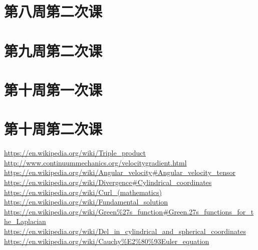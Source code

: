 \documentclass{article}
\numberwithin{equation}{section}
\begin{document}
\section{第八周第二次课}

\section{第九周第二次课}

\section{第十周第一次课}

\section{第十周第二次课}

\begin{thebibliography}{99}
 \href{https://en.wikipedia.org/wiki/Triple_product}{https://en.wikipedia.org/wiki/Triple\_product}
\href{http://www.continuummechanics.org/velocitygradient.html}{http://www.continuummechanics.org/velocitygradient.html}
\href{https://en.wikipedia.org/wiki/Angular_velocity#Angular_velocity_tensor}{https://en.wikipedia.org/wiki/Angular\_velocity\#Angular\_velocity\_tensor}
\href{https://en.wikipedia.org/wiki/Divergence#Cylindrical_coordinates}{https://en.wikipedia.org/wiki/Divergence\#Cylindrical\_coordinates}
\href{https://en.wikipedia.org/wiki/Curl_(mathematics)}{https://en.wikipedia.org/wiki/Curl\_(mathematics)}
\href{https://en.wikipedia.org/wiki/Fundamental_solution}{https://en.wikipedia.org/wiki/Fundamental\_solution}
\href{https://en.wikipedia.org/wiki/Green\%27s_function#Green.27s_functions_for_the_Laplacian}{https://en.wikipedia.org/wiki/Green\%27s\_function\#Green.27s\_functions\_for\_the\_Laplacian}
\href{https://en.wikipedia.org/wiki/Del_in_cylindrical_and_spherical_coordinates}{https://en.wikipedia.org/wiki/Del\_in\_cylindrical\_and\_spherical\_coordinates}
\href{https://en.wikipedia.org/wiki/Cauchy\%E2\%80\%93Euler_equation}{https://en.wikipedia.org/wiki/Cauchy\%E2\%80\%93Euler\_equation}
\end{thebibliography}
\printglossaries
\end{document}
